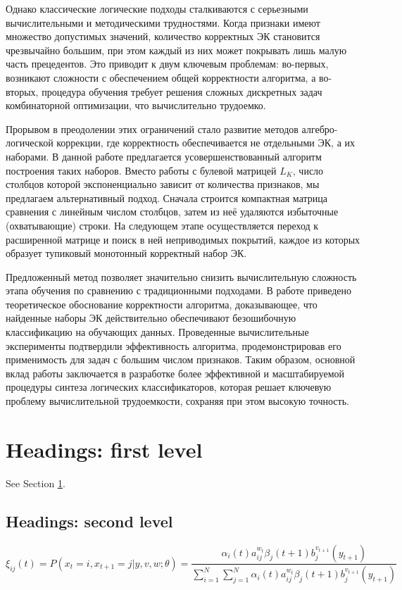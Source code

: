 \documentclass{article}
\begin{document}
Однако классические логические подходы сталкиваются с серьезными вычислительными и методическими трудностями. Когда признаки имеют множество допустимых значений, количество корректных ЭК становится чрезвычайно большим, при этом каждый из них может покрывать лишь малую часть прецедентов. Это приводит к двум ключевым проблемам: во-первых, возникают сложности с обеспечением общей корректности алгоритма, а во-вторых, процедура обучения требует решения сложных дискретных задач комбинаторной оптимизации, что вычислительно трудоемко.

Прорывом в преодолении этих ограничений стало развитие методов алгебро-логической коррекции, где корректность обеспечивается не отдельными ЭК, а их наборами. В данной работе предлагается усовершенствованный алгоритм построения таких наборов. Вместо работы с булевой матрицей $L_K$, число столбцов которой экспоненциально зависит от количества признаков, мы предлагаем альтернативный подход. Сначала строится компактная матрица сравнения с линейным числом столбцов, затем из неё удаляются избыточные (охватывающие) строки. На следующем этапе осуществляется переход к расширенной матрице и поиск в ней неприводимых покрытий, каждое из которых образует тупиковый монотонный корректный набор ЭК.

Предложенный метод позволяет значительно снизить вычислительную сложность этапа обучения по сравнению с традиционными подходами. В работе приведено теоретическое обоснование корректности алгоритма, доказывающее, что найденные наборы ЭК действительно обеспечивают безошибочную классификацию на обучающих данных. Проведенные вычислительные эксперименты подтвердили эффективность алгоритма, продемонстрировав его применимость для задач с большим числом признаков. Таким образом, основной вклад работы заключается в разработке более эффективной и масштабируемой процедуры синтеза логических классификаторов, которая решает ключевую проблему вычислительной трудоемкости, сохраняя при этом высокую точность.

\section{Headings: first level}
\label{sec:headings}

\lipsum[4] See Section \ref{sec:headings}.

\subsection{Headings: second level}
\lipsum[5]
\begin{equation}
	\xi _{ij}(t)=P(x_{t}=i,x_{t+1}=j|y,v,w;\theta)= {\frac {\alpha _{i}(t)a^{w_t}_{ij}\beta _{j}(t+1)b^{v_{t+1}}_{j}(y_{t+1})}{\sum _{i=1}^{N} \sum _{j=1}^{N} \alpha _{i}(t)a^{w_t}_{ij}\beta _{j}(t+1)b^{v_{t+1}}_{j}(y_{t+1})}}
\end{equation}
\end{document}
